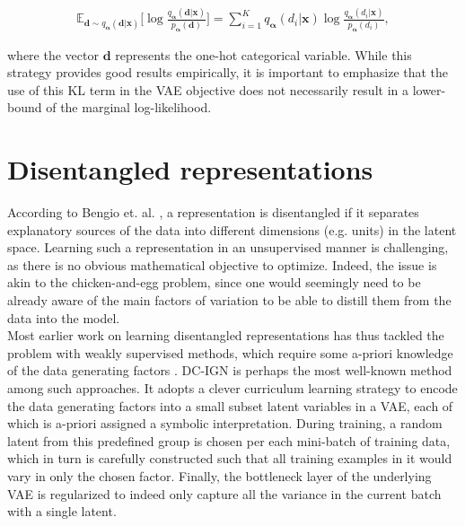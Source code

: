 \documentclass{report}
\begin{document}
\begin{equation}
\begin{gathered}
\mathbb{E}_{\boldsymbol{d} \sim q_{\boldsymbol{\alpha}}(\boldsymbol{d} | \boldsymbol{x})} \Big[ \log \frac{q_{\boldsymbol{\alpha}}(\boldsymbol{d} | \boldsymbol{x})}{p_{\boldsymbol{\alpha}} (\boldsymbol{d})} \Big] = \sum_{i=1}^K q_{\boldsymbol{\alpha}}(d_i | \boldsymbol{x}) \log \frac{q_{\boldsymbol{\alpha}}(d_i | \boldsymbol{x})}{p_{\boldsymbol{\alpha}}(d_i)},
\end{gathered}
\label{eq:analytic-discrete-kl}
\end{equation}

\bigskip

\noindent where the vector $\boldsymbol{d}$ represents the one-hot categorical variable. While this strategy provides good results empirically, it is important to emphasize that the use of this KL term in the VAE objective does not necessarily result in a lower-bound of the marginal log-likelihood.

\section{Disentangled representations}

\noindent According to Bengio et. al. \cite{bengio-representation}, a representation is disentangled if it separates explanatory sources of the data into different dimensions (e.g. units) in the latent space. Learning such a representation in an unsupervised manner is challenging, as there is no obvious mathematical objective to optimize. Indeed, the issue is akin to the chicken-and-egg problem, since one would seemingly need to be already aware of the main factors of variation to be able to distill them from the data into the model. \\

\noindent Most earlier work on learning disentangled representations has thus tackled the problem with weakly supervised methods, which require some a-priori knowledge of the data generating factors \cite{transforming-ae, reed2014, yang2016}. DC-IGN \cite{dcign} is perhaps the most well-known method among such approaches. It adopts a clever curriculum learning \cite{bengio-curriculum} strategy to encode the data generating factors into a small subset latent variables in a VAE, each of which is a-priori assigned a symbolic interpretation. During training, a random latent from this predefined group is chosen per each mini-batch of training data, which in turn is carefully constructed such that all training examples in it would vary in only the chosen factor. Finally, the bottleneck layer of the underlying VAE is regularized to indeed only capture all the variance in the current batch with a single latent. \\
\end{document}
